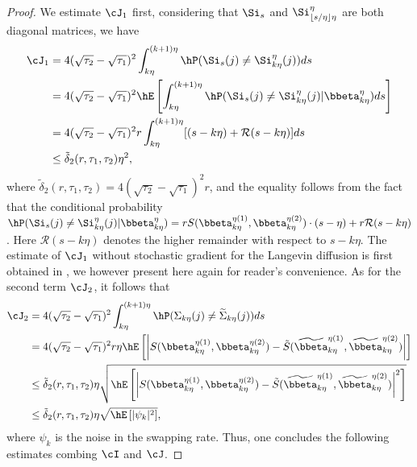 \begin{proof}
We estimate $\cJ_1$ first, considering that $\Si_s$ and $\Si^{\eta}_{\lfloor s/\eta\rfloor \eta}$ are both diagonal matrices, we have
\begin{equation*}
    \begin{split}
        \cJ_1&=4(\sqrt{\tau_2}-\sqrt{\tau_1})^2\int_{k \eta}^{(k+1)\eta}\hP(\Si_s(j)\neq \Si^{\eta}_{k \eta}(j))ds\\
        &=4(\sqrt{\tau_2}-\sqrt{\tau_1})^2\hE\left[\int_{k \eta}^{(k+1)\eta}\hP(\Si_s(j)\neq \Si^{\eta}_{k \eta}(j)|\bbeta^{\eta}_{k \eta})ds\right]\\
        &= 4(\sqrt{\tau_2}-\sqrt{\tau_1})^2 r\int_{k \eta}^{(k+1)\eta} [(s-k \eta)+\mathcal R(s-k \eta)]ds\\
        &\le \tilde \delta_2(r, \tau_1,\tau_2)\eta^2,
    \end{split}{}
\end{equation*}{}
where $\tilde \delta_2(r, \tau_1,\tau_2)=4(\sqrt{\tau_2}-\sqrt{\tau_1})^2 r$, and the equality follows from the fact that the conditional probability $\hP(\Si_s(j)\neq \Si^{\eta}_{k \eta}(j)|\bbeta^{\eta}_{k \eta})=r S(\bbeta^{\eta(1)}_{k \eta},\bbeta^{\eta(2)}_{k \eta})\cdot(s-\eta)+r\mathcal R(s-k \eta)$. Here $\mathcal R(s-k \eta)$ denotes the higher remainder with respect to $s-k \eta$. The estimate of $\cJ_1$ without stochastic gradient for the Langevin diffusion is first obtained in \citet{chen2018accelerating}, we however present here again for reader's convenience.  
As for the second term $\cJ_2$, it follows that
\begin{equation}
	\begin{split}
	\label{new_prob}
	    \cJ_2&=4(\sqrt{\tau_2}-\sqrt{\tau_1})^2\int_{k \eta}^{(k+1)\eta}\hP(\Sigma_{k \eta}(j)\neq \widetilde \Sigma_{k \eta}(j))ds \\
	    &= 4(\sqrt{\tau_2}-\sqrt{\tau_1})^2 r\eta \hE\left[\left|S(\bbeta_{k \eta}^{\eta(1)}, \bbeta_{k \eta}^{\eta(2)})-\tilde S(\widetilde \bbeta_{k \eta}^{\eta(1)}, \widetilde \bbeta_{k \eta}^{\eta(2)})\right|\right] \\
	    &\le \tilde \delta_2(r, \tau_1,\tau_2) \eta \sqrt{\hE\left[\left|S(\bbeta_{k \eta}^{\eta(1)}, \bbeta_{k \eta}^{\eta(2)})-\tilde S(\widetilde \bbeta_{k \eta}^{\eta(1)}, \widetilde \bbeta_{k \eta}^{\eta(2)})\right|^2\right]}\\
	    & \leq \tilde \delta_2(r, \tau_1,\tau_2) \eta \sqrt{\hE\left[|\psi_{k}|^2\right]},
	\end{split}
\end{equation}
where $\psi_{k}$ is the noise in the swapping rate. Thus, one concludes the following estimates combing $\cI$ and $\cJ$.

\end{proof}
